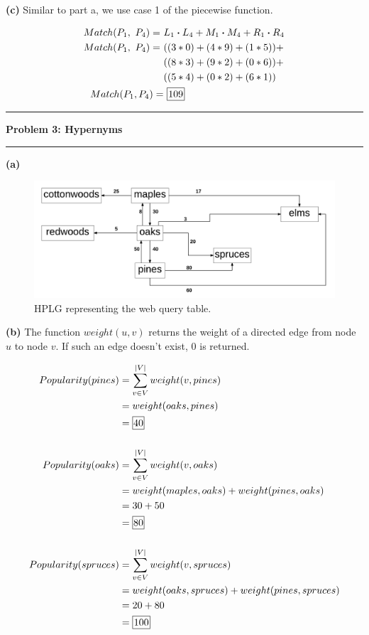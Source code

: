 \documentclass[11pt]{article}
\newcommand\question[2]{\vspace{.25in}\hrule\textbf{#1: #2}\vspace{.5em}\hrule\vspace{.10in}}
\renewcommand\part[1]{\vspace{.10in}\textbf{(#1)}}
\begin{document}
\part{c} Similar to part a, we use case 1 of the piecewise function.

\begin{align*}
Match(P_1, \ P_4) = \ &L_1 \boldsymbol{\cdot} L_4 + M_1 \boldsymbol{\cdot} M_4 + R_1 \boldsymbol{\cdot} R_4  \\ Match(P_1, \ P_4) = \ &((3 * 0) + (4 * 9) + (1 * 5)) + \\ & ((8 * 3) + (9 * 2) + (0 * 6)) + \\ & ((5 * 4) + (0 * 2) + (6 * 1))\\Match(P_1, P_4) = & \ \framebox[1.2\width]{109}
\end{align*}

\question{Problem 3}{Hypernyms}

\part{a}

\begin{figure}[H]
  \centerline{\includegraphics[width=0.5\linewidth]{hplg.png}}
  \caption{HPLG representing the web query table.}
\end{figure}

\part{b} The function $weight(u, v)$ returns the weight of a directed edge from node $u$ to node $v$. If such an edge doesn't exist, 0 is returned.

\begin{align*}
Popularity(pines) &= \sum_{v \in V}^{|V|} weight(v, pines) \\
&= weight(oaks, pines) \\
&= \framebox[1.2\width]{40} \\ \\
Popularity(oaks) &= \sum_{v \in V}^{|V|} weight(v, oaks) \\
&= weight(maples, oaks) + weight(pines, oaks) \\
&= 30 + 50 \\
&= \framebox[1.2\width]{80} \\ \\
Popularity(spruces) &= \sum_{v \in V}^{|V|} weight(v, spruces) \\
&= weight(oaks, spruces) + weight(pines, spruces) \\
&= 20 + 80 \\
&= \framebox[1.2\width]{100}
\end{align*}
\end{document}
